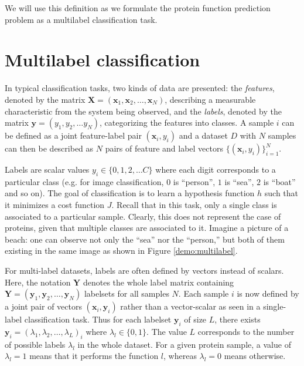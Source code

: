 \par We will use this definition as we formulate the protein function
prediction problem as a multilabel classification task.


\section{Multilabel classification}
\label{MultilabelClassification}

\par In typical classification tasks, two kinds of data are presented:
the \textit{features}, denoted by the matrix $\mathbf{X} =
(\mathbf{x}_{1}, \mathbf{x}_{2}, \dots, \mathbf{x}_{N})$, describing
a measurable characteristic from the system being observed, and the
\textit{labels}, denoted by the matrix $\mathbf{y} = (y_{1}, y_{2}, \dots
y_{N})$, categorizing the features into classes. A sample $i$
can be defined as a joint feature-label pair $(\mathbf{x}_{i}, y_{i})$ and a
dataset $D$ with $N$ samples can then be described as $N$ pairs of feature
and label vectors  $\{(\mathbf{x}_{i}, y_{i})\}_{i=1}^{N}$.

\par Labels are scalar values $y_{i} \in \{0, 1, 2, \dots C\}$ where each digit 
corresponds to a particular class (e.g. for image classification, $0$ is
``person'', $1$ is ``sea'', $2$ is ``boat'' and so on). The goal of
classification is to learn a hypothesis function $h$ such that it minimizes a
cost function $J$. Recall that in this task, only a single class is associated
to a particular sample. Clearly, this does not represent the case of proteins,
given that multiple classes are associated to it. Imagine a picture of a beach:
one can observe not only the ``sea'' nor the ``person,'' but both of them
existing in the same image as shown in Figure \ref{demo:multilabel}.


\par For multi-label datasets, labels are often defined by vectors instead of
scalars. Here, the notation $\mathbf{Y}$ denotes the whole label matrix
containing $\mathbf{Y} = (\mathbf{y}_{1},\mathbf{y}_{2}, \dots,
\mathbf{y}_{N})$ labelsets for all samples $N$. Each sample $i$ is now defined
by a joint pair of vectors $(\mathbf{x}_{i}, \mathbf{y}_{i})$ rather than a
vector-scalar as seen in a single-label classification task. Thus for each
labelset $\mathbf{y}_{i}$ of size $L$, there exists $\mathbf{y}_{i} =
(\lambda_{1}, \lambda_{2}, \dots, \lambda_{L})_{i}$ where $\lambda_{l} \in \{0,
1\}$. The value $L$ corresponds to the number of possible labels $\lambda_{l}$
in the whole dataset. For a given protein sample, a value of $\lambda_{l}=1$
means that it performs the function $l$, whereas $\lambda_{l}=0$ means
otherwise.

